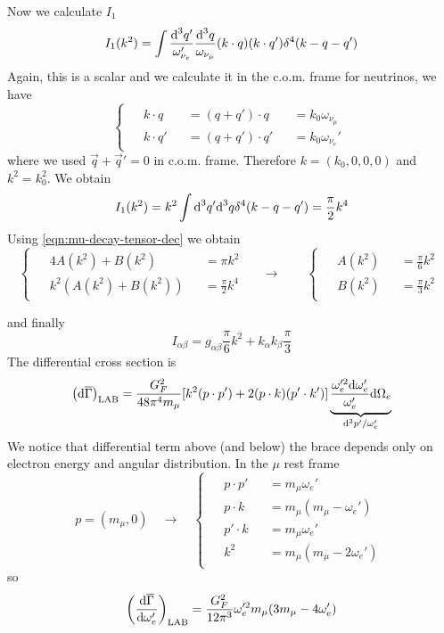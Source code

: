 \documentclass[TheoreticalPhy_ModB.tex]{subfiles}
\begin{document}
Now we calculate $I_1$
\[I_1(k^2)=\int\frac{\textup{d}^3q'}{\omega_{\nu_e}'}\frac{\textup{d}^3q}{\omega_{\nu_\mu}}(k\cdot q)(k\cdot q')\delta^4(k-q-q')\]
Again, this is a scalar and we calculate it in the c.o.m. frame for neutrinos, we have
\[\begin{cases}\begin{alignedat}{3}
&k\cdot q&&=(q+q')\cdot q&&=k_0\omega_{\nu_\mu}\\
&k\cdot q'&&=(q+q')\cdot q'&&=k_0\omega_{\nu_e}'
\end{alignedat}\end{cases}\]
where we used $\vec q+\vec q'=0$ in c.o.m. frame. Therefore $k=(k_0,0,0,0)$ and $k^2=k_0^2$. We obtain
\[I_1(k^2)=k^2\int \textup{d}^3q' \textup{d}^3q\delta^4(k-q-q')=\frac\pi2k^4\]
Using \eqref{eqn:mu-decay-tensor-dec} we obtain
\[\begin{cases}\begin{alignedat}{2}
&4A(k^2)+B(k^2)&&=\pi k^2\\
&k^2(A(k^2)+B(k^2))&&=\frac\pi2k^4
\end{alignedat}\end{cases}
\quad\to\qquad
\begin{cases}\begin{alignedat}{2}
&A(k^2)&&=\frac\pi6 k^2\\
&B(k^2)&&=\frac\pi3k^2
\end{alignedat}\end{cases}
\]

and finally 
\[I_{\alpha\beta}=g_{\alpha\beta}\frac\pi6k^2+k_\alpha k_\beta\frac\pi3\]
The differential cross section is 
\[\left(\textup{d}\overline\Gamma\right)_{\text{LAB}}
=\frac{G_F^2}{48\pi^4m_\mu}[k^2(p\cdot p')+2(p\cdot k)(p'\cdot k')]\underbrace{\frac{\omega_e'^2\textup{d}\omega_e'}{\omega_e'}\textup{d}\Omega_e}_{\textup{d}^3p'/\omega_e'}\]
We notice that differential term above (and below) the brace depends only on electron energy and angular distribution. In the $\mu$ rest frame
\[p=(m_\mu,0)\quad\to\quad
\begin{cases}\begin{alignedat}{2}
&p\cdot p'&&=m_\mu\omega_e'\\
&p\cdot k&&=m_\mu(m_\mu-\omega_e')\\
&p'\cdot k&&=m_\mu\omega_e'\\
&k^2&&=m_\mu(m_\mu-2\omega_e')
\end{alignedat}\end{cases}
\]
so
\[\left(\frac{\textup{d}\overline\Gamma}{\textup{d}\omega_e'}\right)_{\text{LAB}}
=\frac{G_F^2}{12\pi^3}\omega_e'^2m_\mu(3m_\mu-4\omega'_e)\]
\end{document}
